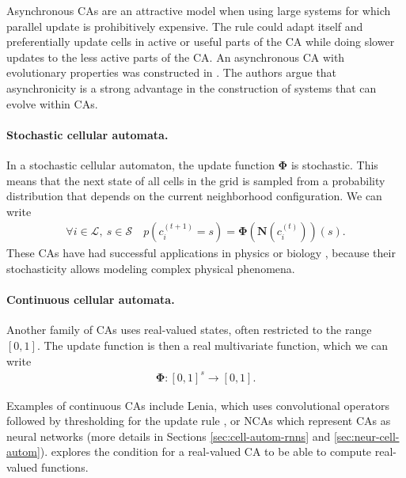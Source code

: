 Asynchronous \acp{CA} are an attractive model when using large systems for which
parallel update is prohibitively expensive. The rule could adapt itself and
preferentially update cells in active or useful parts of the \ac{CA} while doing
slower updates to the less active parts of the \ac{CA}. An asynchronous \ac{CA}
with evolutionary properties was constructed in
\parencite{nehanivEvolutionAsynchronousCellular2003}. The authors argue that
asynchronicity is a strong advantage in the construction of systems that can evolve
within \acp{CA}.

\paragraph{Stochastic cellular automata.}
In a stochastic cellular automaton, the update function $\boldsymbol{\Phi}$ is
stochastic. This means that the next state of all cells in the grid is
sampled from a probability distribution that depends on the current neighborhood
configuration. We can write
\begin{equation}
\begin{aligned}
  \forall i \in \mathcal{L},\ s \in \mathcal{S} \quad p\left(c_{i}^{(t + 1)} = s \right) = \boldsymbol{\Phi} \left(\boldsymbol{N}\left(c_{i}^{(t)}\right)\right)(s).
\end{aligned}
\end{equation}
These \acp{CA} have had successful applications in physics
\parencite{vichniacSimulatingPhysicsCellular1984,
  ottaviSimulationIsingModel1989} or biology
\parencite{boasCellularPottsModel2018}, because their stochasticity allows
modeling complex physical phenomena.

\paragraph{Continuous cellular automata.}
Another family of \acp{CA} uses real-valued states, often restricted to the range
$[0, 1]$. The update function is then a real multivariate function, which we can
write
\begin{equation}
  \begin{aligned}
  \boldsymbol{\Phi}: [0, 1]^{s} \rightarrow [0, 1].
  \end{aligned}
  \label{eq:phi_cont}
\end{equation}

Examples of continuous \acp{CA} include Lenia, which uses convolutional operators
followed by thresholding for the update rule
\parencite{chanLeniaBiologyArtificial2019a}, or \acp{NCA}
\parencite{mordvintsevGrowingNeuralCellular2020} which represent \acp{CA} as
neural networks (more details in Sections \ref{sec:cell-autom-rnns} and
\ref{sec:neur-cell-autom}). \textcite{garzonRealComputationCellular1993}
explores the condition for a real-valued \ac{CA} to be able to compute
real-valued functions.


